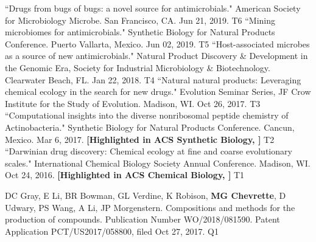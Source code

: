 \begin{cvpubs}
  \cvpub
    {``Drugs from bugs of bugs: a novel source for antimicrobials." American Society for Microbiology Microbe. San Francisco, CA. Jun 21, 2019.} %
    {T6} %
  \cvpub
    {``Mining microbiomes for antimicrobials." Synthetic Biology for Natural Products Conference. Puerto Vallarta, Mexico. Jun 02, 2019.} %
    {T5} %
  \cvpub
    {``Host-associated microbes as a source of new antimicrobials." Natural Product Discovery \& Development in the Genomic Era, Society for Industrial Microbiology \& Biotechnology. Clearwater Beach, FL. Jan 22, 2018.} %
    {T4} %
  \cvpub
    {``Natural natural products: Leveraging chemical ecology in the search for new drugs." Evolution Seminar Series, JF Crow Institute for the Study of Evolution. Madison, WI. Oct 26, 2017.} %
    {T3} %
  \cvpub
    {``Computational insights into the diverse nonribosomal peptide chemistry of Actinobacteria." Synthetic Biology for Natural Products Conference. Cancun, Mexico. Mar 6, 2017.
	\linebreak \textbf{[Highlighted in ACS Synthetic Biology, \textit{}]}    
    } %
    {T2} %
  \cvpub
    {``Darwinian drug discovery: Chemical ecology at fine and coarse evolutionary scales." International Chemical Biology Society Annual Conference. Madison, WI. Oct 24, 2016.
	\linebreak \textbf{[Highlighted in ACS Chemical Biology, \textit{}]}     
    } %
    {T1} %
\end{cvpubs}


\begin{cvpubs}
  \cvpub
    {DC Gray, E Li, BR Bowman, GL Verdine, K Robison, \textbf{MG Chevrette}, D Udwary, PS Wang, A Li, JP Morgenstern. Compositions and methods for the production of compounds. Publication Number WO/2018/081590. Patent Application PCT/US2017/058800, filed Oct 27, 2017. \textbf{\textit{}} }  %
    {Q1} %
\end{cvpubs}


